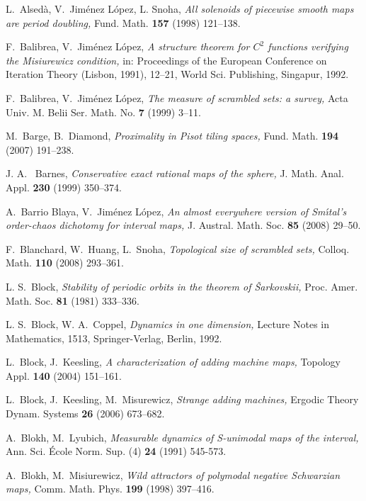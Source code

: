\documentclass[12pt, psamsfonts, reqno]{amsart}
\begin{document}
\begin{thebibliography}{BKNS}

 L.\ Alsed\`a, V.\ Jim\'enez L\'opez, L. Snoha,
{\em  All solenoids of piecewise smooth maps are period doubling,}
Fund. Math. {\bf 157} (1998) 121--138.

 F.\ Balibrea, V.\ Jim\'enez L\'opez,
{\em A structure theorem for $C^2$ functions verifying the
Misiurewicz condition,} in: Proceedings of the European Conference
on Iteration Theory (Lisbon, 1991),  12--21, World Sci.
Publishing, Singapur, 1992.

 F.\ Balibrea, V.\ Jim\'enez L\'opez,
{\em The measure of scrambled sets: a survey,} Acta Univ. M. Belii
Ser. Math. No. {\bf 7} (1999) 3--11.

 M.\ Barge, B.\ Diamond,
{\em Proximality in Pisot tiling spaces,} Fund. Math. {\bf 194}
(2007) 191--238.

 J. A. \ Barnes,
{\em Conservative exact rational maps of the sphere,} J. Math.
Anal. Appl. {\bf 230} (1999) 350--374.

 A.\ Barrio Blaya, V.\ Jim\'enez L\'opez,
{\em An almost everywhere version of Sm\'{\i}tal's order-chaos
dichotomy for interval maps,} J. Austral. Math. Soc. {\bf 85}
(2008) 29--50.

 F.\ Blanchard, W.\ Huang, L.\ Snoha,
{\em  Topological size of scrambled sets, } Colloq. Math. {\bf
110} (2008) 293--361.

 L. S.\ Block, {\em Stability of periodic orbits
in the theorem of \v{S}arkovskii,}  Proc. Amer. Math. Soc. {\bf
81}  (1981) 333--336.

 L. S.\ Block, W. A.\ Coppel,
{\em Dynamics in one dimension,} Lecture Notes in Mathematics,
1513, Springer-Verlag, Berlin, 1992.

 L.\ Block, J.\ Keesling,
{\em A characterization of adding machine maps,} Topology Appl.
{\bf 140} (2004) 151--161.

 L.\ Block, J.\ Keesling, M.\ Misurewicz,
{\em Strange adding machines,} Ergodic Theory Dynam. Systems  {\bf
26}  (2006) 673--682.

 A.\ Blokh, M.\ Lyubich,
{\em Measurable dynamics of S-unimodal maps of the interval,} Ann.
Sci. \'Ecole Norm. Sup. (4)  {\bf 24} (1991) 545-573.

A.\ Blokh, M.\ Misiurewicz, {\em Wild attractors of polymodal
negative Schwarzian maps,} Comm. Math. Phys. {\bf 199} (1998)
397--416.


\end{thebibliography}
\end{document}
